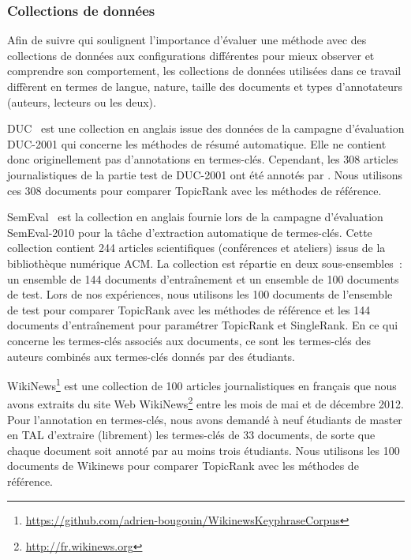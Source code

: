       \subsubsection{Collections de données}
      \label{subsubsec:main-automatic_keyphrase_annotation-unsupervised_automatic_keyphrase_extraction-evaluation-evaluation_data}
        Afin de suivre  qui soulignent
        l'importance d'évaluer une méthode avec des collections de données aux
        configurations différentes pour mieux observer et comprendre son
        comportement, les collections de données utilisées dans ce travail
        diffèrent en termes de langue, nature, taille des documents et types
        d'annotateurs (auteurs, lecteurs ou les deux).

        DUC~\cite{over2001duc} est une collection en anglais issue des données
        de la campagne d'évaluation DUC-2001 qui concerne les méthodes de résumé
        automatique. Elle ne contient donc originellement pas d'annotations en
        termes-clés. Cependant, les 308 articles journalistiques de la partie
        test de DUC-2001 ont été annotés par . Nous
        utilisons ces 308 documents pour comparer TopicRank avec les méthodes de
        référence.

        SemEval~\cite{kim2010semeval} est la collection en anglais fournie lors
        de la campagne d'évaluation SemEval-2010 pour la tâche d'extraction
        automatique de termes-clés. Cette collection contient 244 articles
        scientifiques (conférences et ateliers) issus de la bibliothèque
        numérique ACM. La collection est répartie en deux sous-ensembles~: un
        ensemble de 144 documents d'entraînement et un ensemble de 100 documents
        de test. Lors de nos expériences, nous utilisons les 100 documents de
        l'ensemble de test pour comparer TopicRank avec les méthodes de
        référence et les 144 documents d'entraînement pour paramétrer TopicRank
        et SingleRank. En ce qui concerne les termes-clés associés aux
        documents, ce sont les termes-clés des auteurs combinés aux termes-clés
        donnés par des étudiants.

        WikiNews\footnote{\url{https://github.com/adrien-bougouin/WikinewsKeyphraseCorpus}}
        est une collection de 100 articles journalistiques en français que nous
        avons extraits du site Web
        WikiNews\footnote{\url{http://fr.wikinews.org}} entre les mois de mai et
        de décembre 2012. Pour l'annotation en termes-clés, nous avons demandé à
        neuf étudiants de master en TAL d'extraire (librement) les termes-clés
        de 33 documents, de sorte que chaque document soit annoté par au moins
        trois étudiants. Nous utilisons les 100 documents de Wikinews pour
        comparer TopicRank avec les méthodes de référence.

